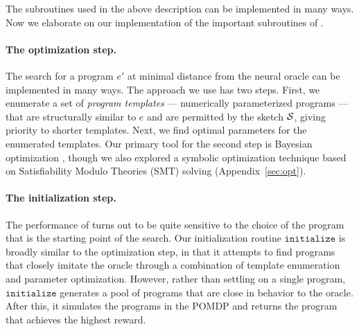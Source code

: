 The subroutines used in the above description can be implemented in many ways. Now we elaborate on our implementation of the important subroutines of \algo. 

\paragraph{The optimization step.}
The search for a program $e'$ at minimal distance from the neural oracle can be implemented in many ways. The approach we use has two steps. First, we enumerate a set of {\em program templates} --- numerically parameterized programs --- that are structurally similar to $e$ and are permitted by the sketch $\S$, giving priority to shorter templates. Next, we find optimal parameters for the enumerated templates.
Our primary tool for the second step is Bayesian optimization \cite{BayesianOpt}, though we also explored a symbolic optimization technique based on Satisfiability Modulo Theories (SMT) solving  (Appendix~\ref{sec:opt}).

\paragraph{The initialization step.}
The performance of \algo turns out to be quite sensitive to the choice of the program that is the starting point of the search. 
Our initialization routine $\mathtt{initialize}$ is broadly similar to the optimization step, in that it attempts to find programs that closely imitate the oracle through a combination of template enumeration and parameter optimization. 
However, rather than settling on a single program, $\mathtt{initialize}$ generates a pool of programs that are close in behavior to the oracle. After this, it simulates the programs in the POMDP and returns the program that achieves the highest reward.
